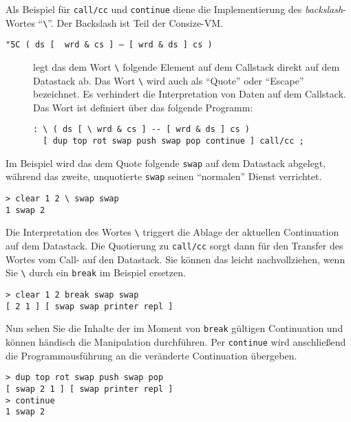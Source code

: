 Als Beispiel für \verb|call/cc| und \verb|continue| diene die Implementierung des \emph{backslash}-Wortes "`\verb|\|"'. Der Backslash ist Teil der Consize-VM.

\begin{description}
\item[\texttt{{\char "5C}\ ( ds [ \ wrd \& cs ] -- [ wrd \& ds ] cs )}] legt das dem Wort \verb|\| folgende Element auf dem Callstack direkt auf dem Datastack ab. Das Wort \verb|\| wird auch als "`Quote"' oder "`Escape"' bezeichnet. Es verhindert die Interpretation von Daten auf dem Callstack. Das Wort ist definiert über das folgende Programm:
\begin{verbatim}
: \ ( ds [ \ wrd & cs ] -- [ wrd & ds ] cs )   
  [ dup top rot swap push swap pop continue ] call/cc ;
\end{verbatim}
\end{description}

Im Beispiel wird das dem Quote folgende \verb|swap| auf dem Datastack abgelegt, während das zweite, unquotierte \verb|swap| seinen "`normalen"' Dienst verrichtet.

\begin{verbatim}
> clear 1 2 \ swap swap
1 swap 2
\end{verbatim}

Die Interpretation des Wortes \verb|\| triggert die Ablage der aktuellen Continuation auf dem Datastack. Die Quotierung zu \verb|call/cc| sorgt dann für den Transfer des Wortes vom Call- auf den Datastack. Sie können das leicht nachvollziehen, wenn Sie \verb|\| durch ein \verb|break| im Beispiel ersetzen.

\begin{verbatim}
> clear 1 2 break swap swap
[ 2 1 ] [ swap swap printer repl ]
\end{verbatim}

Nun sehen Sie die Inhalte der im Moment von \verb|break| gültigen Continuation und können händisch die Manipulation durchführen. Per \verb|continue| wird anschließend die Programmausführung an die veränderte Continuation übergeben.

\begin{verbatim}
> dup top rot swap push swap pop
[ swap 2 1 ] [ swap printer repl ]
> continue
1 swap 2
\end{verbatim}

